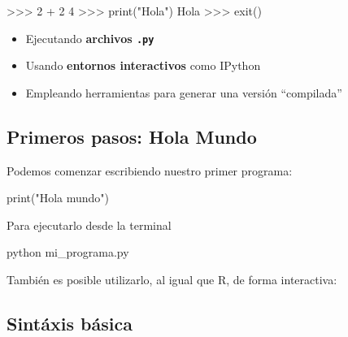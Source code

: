 \documentclass[
]{book}
\newenvironment{Shaded}{\begin{snugshade}}{\end{snugshade}}
\newcommand{\BuiltInTok}[1]{#1}
\newcommand{\ExtensionTok}[1]{#1}
\newcommand{\NormalTok}[1]{#1}
\newcommand{\StringTok}[1]{\textcolor[rgb]{0.31,0.60,0.02}{#1}}
\providecommand{\tightlist}{%
  \setlength{\itemsep}{0pt}\setlength{\parskip}{0pt}}
\theoremstyle{break}
\theoremstyle{nonumberplain}
\begin{document}
\begin{Shaded}
\begin{Highlighting}[]
\NormalTok{\textgreater{}\textgreater{}\textgreater{} 2 + 2}
\NormalTok{4}
\NormalTok{\textgreater{}\textgreater{}\textgreater{} print("Hola")}
\NormalTok{Hola}
\NormalTok{\textgreater{}\textgreater{}\textgreater{} exit()}
\end{Highlighting}
\end{Shaded}

\begin{itemize}
\tightlist
\item
  Ejecutando \textbf{archivos \texttt{.py}}
\end{itemize}

\begin{Shaded}
\end{Shaded}

\begin{itemize}
\tightlist
\item
  Usando \textbf{entornos interactivos} como IPython
\item
  Empleando herramientas para generar una versión ``compilada''
\end{itemize}

\subsection{Primeros pasos: Hola Mundo}\label{primeros-pasos-hola-mundo}

Podemos comenzar escribiendo nuestro primer programa:

\begin{Shaded}
\begin{Highlighting}[]
\BuiltInTok{print}\NormalTok{(}\StringTok{"Hola mundo"}\NormalTok{)}
\end{Highlighting}
\end{Shaded}

Para ejecutarlo desde la terminal

python mi\_programa.py

También es posible utilizarlo, al igual que R, de forma interactiva:

\subsection{Sintáxis básica}\label{sintuxe1xis-buxe1sica}
\end{document}
